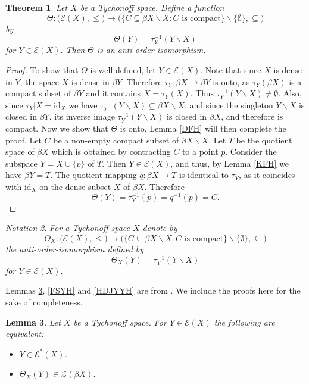 \documentclass{amsart}
\newtheorem{theorem}{Theorem}[section]
\newtheorem{lemma}[theorem]{Lemma}
\theoremstyle{definition}
\theoremstyle{remark}
\theoremstyle{notation}
\newtheorem{notation}[theorem]{Notation}
\numberwithin{equation}{section}
\begin{document}
\begin{theorem}\label{JHV}
Let $X$ be a Tychonoff space. Define a function
\[\Theta:\big({\mathscr E}(X),\leq\big)\rightarrow\big(\{C\subseteq\beta X\backslash X:C \mbox{ is compact} \}\backslash\{\emptyset\},\subseteq\big)\]
by
\[\Theta(Y)=\tau^{-1}_Y(Y\backslash X)\]
for $Y\in{\mathscr E}(X)$. Then $\Theta$ is an anti-order-isomorphism.
\end{theorem}

\begin{proof}
To show that  $\Theta$ is well-defined, let $Y\in{\mathscr E}(X)$. Note that since $X$ is  dense in $Y$, the space $X$ is dense in  $\beta Y$. Therefore     $\tau_Y:\beta X\rightarrow \beta Y$ is onto, as $\tau_Y(\beta X)$ is a compact subset of $\beta Y$ and it contains $X=\tau_Y(X)$. Thus  $\tau^{-1}_Y(Y\backslash X)\neq\emptyset$. Also,  since $\tau_Y|X=\mbox{id}_X$ we have $\tau^{-1}_Y(Y\backslash X)\subseteq\beta X\backslash X$, and since the singleton $Y\backslash X$ is closed in $\beta Y$, its inverse image $\tau^{-1}_Y(Y\backslash X)$ is closed in $\beta X$, and therefore is compact. Now we show that $\Theta$ is onto,  Lemma \ref{DFH} will then complete the proof. Let $C$  be a non-empty  compact subset of $\beta X\backslash X$. Let $T$ be the quotient space of $\beta X$ which is obtained by contracting $C$ to a point $p$. Consider the subspace $Y=X\cup\{p\}$  of $T$. Then $Y\in{\mathscr E}(X)$, and thus, by Lemma \ref{KFH} we have $\beta Y=T$. The quotient mapping $q:\beta X\rightarrow T$ is identical to $\tau_Y$, as it coincides with $\mbox{id}_X$ on the dense subset $X$ of $\beta X$. Therefore
\[\Theta(Y)=\tau^{-1}_Y(p)=q^{-1}(p)=C.\]
\end{proof}

\begin{notation}\label{GFD}
{\em For a  Tychonoff space $X$ denote by
\[\Theta_X:\big({\mathscr E}(X),\leq\big)\rightarrow\big(\{C\subseteq \beta X\backslash X:C \mbox{ is compact} \}\backslash\{\emptyset\},\subseteq\big)\]
the anti-order-isomorphism defined by
\[\Theta_X(Y)=\tau^{-1}_Y(Y\backslash X)\]
for $Y\in {\mathscr E}(X)$.}
\end{notation}

Lemmas \ref{JYYH}, \ref{FSYH} and \ref{HDJYYH} are from  \cite{Ko2}. We include the proofs here for the sake of completeness.

\begin{lemma}\label{JYYH}
Let $X$ be a Tychonoff  space. For $Y\in{\mathscr E}(X)$ the following are equivalent:
\begin{itemize}
\item[\rm(1)] $Y\in{\mathscr E}^*(X)$.
\item[\rm(2)] $\Theta_X(Y)\in {\mathscr Z}(\beta X)$.
\end{itemize}
\end{lemma}
\end{document}
